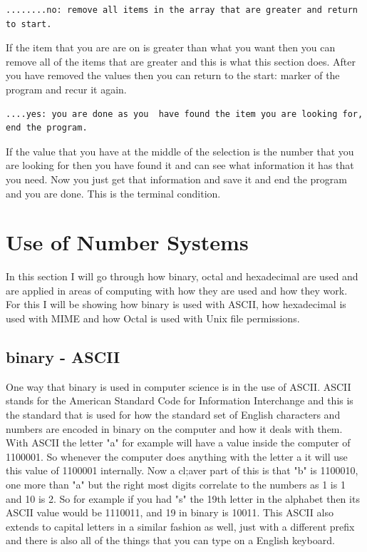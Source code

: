\documentclass{article}
\begin{document}
\begin{verbatim}
........no: remove all items in the array that are greater and return to start.
\end{verbatim}
If the item that you are are on is greater than what you want then you can remove all of the items that are greater and this is what this section does. After you have removed the values then you can return to the start: marker of the program and recur it again. 

\begin{verbatim}
....yes: you are done as you  have found the item you are looking for, end the program. 
\end{verbatim}
If the value that you have at the middle of the selection is the number that you are looking for then you have found it and can see what information it has that you need. Now you just get that information and save it and end the program and you are done. This is the terminal condition. 

\section{Use of Number Systems}
In this section I will go through how binary, octal and hexadecimal are used and are applied in areas of computing with how they are used and how they work. For this I will be showing how binary is used with ASCII, how hexadecimal is used with MIME and how Octal is used with Unix file permissions. 
\subsection{binary - ASCII}
One way that binary is used in computer science is in the use of ASCII. ASCII stands for the American Standard Code for Information Interchange and this is the standard that is used for how the standard set of English characters and numbers are encoded in binary on the computer and how it deals with them. With ASCII the letter "a" for example will have a value inside the computer of 1100001. So whenever the computer does anything with the letter a it will use this value of 1100001 internally. Now a cl;aver part of this is that "b" is 1100010, one more than "a" but the right most digits correlate to the numbers as 1 is 1 and 10 is 2. So for example if you had "s" the 19th letter in the alphabet then its ASCII value would be 1110011, and 19 in binary is 10011. This ASCII also extends to capital letters in a similar fashion as well, just with a different prefix and there is also all of the things that you can type on a English keyboard.  
\end{document}
